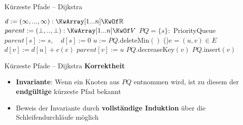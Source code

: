 \begin{frame}{Kürzeste Pfade – Dijkstra}  \vspace{-.25\baselineskip}
	\begin{exampleblock}{} \vspace{-.4\baselineskip}
		\begin{algorithm}[H]
			\small
			 {
				$d := (\infty, ..., \infty) : \KwArray[1...n] \KwOf \R$\;
				$parent := (\bot, .., \bot) : \KwArray[1...n] \KwOf V$\;
				$PQ = \{s\} : $ PriorityQueue\;
				$parent[s] := s, \quad d[s] := 0$ \;
				 {
					$u := PQ.$deleteMin$()$  \;
					\ForEach(){$e = (u, v) \in E$} {
						 {
							$d[v] := d[u] +c(e)$\;
							$parent[v] := u$\;
							 {
								$PQ.$decreaseKey$(v)$\;
							}{
							$PQ.$insert$(v)$\;
							}
						}
					}
				}
				\;
			}
		\end{algorithm}
	\end{exampleblock}
\end{frame}

\begin{frame}{Kürzeste Pfade – Dijkstra}
	\textbf{Korrektheit}
	\begin{itemize}
		\item \textbf{Invariante}: Wenn ein Knoten aus $PQ$ entnommen wird, ist zu diesem der \textbf{endgültige} kürzeste Pfad bekannt
		\pause
		\item Beweis der Invariante durch \textbf{vollständige Induktion} über die Schleifendurchläufe möglich
	\end{itemize}
\end{frame}

\iffalse

